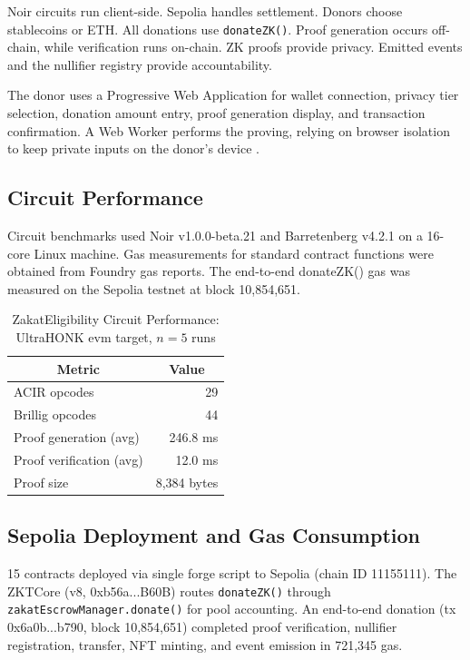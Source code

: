 \documentclass[conference]{IEEEtran}
\begin{document}
Noir circuits run client-side. Sepolia handles settlement. Donors choose stablecoins or ETH. All donations use \texttt{donateZK()}. Proof generation occurs off-chain, while verification runs on-chain. ZK proofs provide privacy. Emitted events and the nullifier registry provide accountability.

The donor uses a Progressive Web Application for wallet connection, privacy tier selection, donation amount entry, proof generation display, and transaction confirmation. A Web Worker performs the proving, relying on browser isolation to keep private inputs on the donor's device \cite{b_zkp_blockchain}.

\subsection{Circuit Performance}

Circuit benchmarks used Noir v1.0.0-beta.21 and Barretenberg v4.2.1 on a 16-core Linux machine. Gas measurements for standard contract functions were obtained from Foundry gas reports. The end-to-end donateZK() gas was measured on the Sepolia testnet at block 10,854,651.

\begin{table}[htbp]
\caption{ZakatEligibility Circuit Performance: UltraHONK evm target, $n=5$ runs}
\label{tab:proof_perf}
\begin{center}
\begin{tabular}{|l|r|}
\hline
\multicolumn{1}{|c|}{\textbf{Metric}} & \multicolumn{1}{c|}{\textbf{Value}} \\
\hline
ACIR opcodes               & 29 \\
Brillig opcodes            & 44 \\
Proof generation (avg)     & 246.8 ms \\
Proof verification (avg)    & 12.0 ms \\
Proof size                  & 8,384 bytes \\
\hline
\end{tabular}
\end{center}
\end{table}

\subsection{Sepolia Deployment and Gas Consumption}

15 contracts deployed via single forge script to Sepolia (chain ID 11155111). The ZKTCore (v8, 0xb56a...B60B) routes \texttt{donateZK()} through \texttt{zakatEscrowManager.donate()} for pool accounting. An end-to-end donation (tx 0x6a0b...b790, block 10,854,651) completed proof verification, nullifier registration, transfer, NFT minting, and event emission in 721,345 gas.
\end{document}

